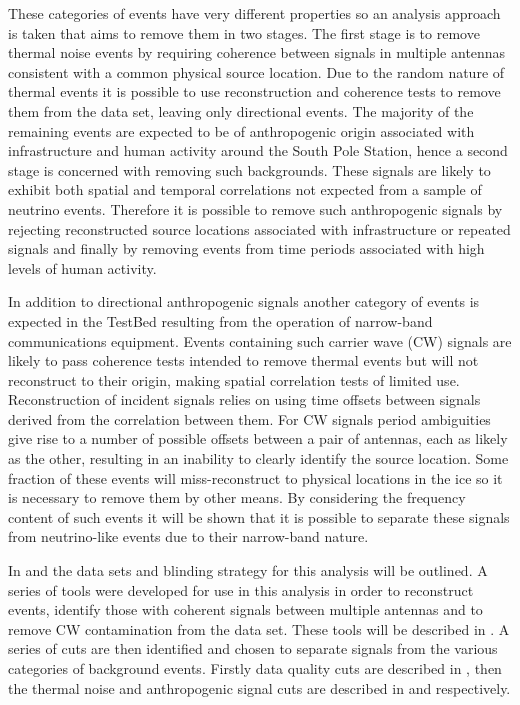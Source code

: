 These categories of events have very different properties so an analysis approach is taken that aims to remove them in two stages. The first stage is to remove thermal noise events by requiring coherence between signals in multiple antennas consistent with a common physical source location. Due to the random nature of thermal events it is possible to use reconstruction and coherence tests to remove them from the data set, leaving only directional events. The majority of the remaining events are expected to be of anthropogenic origin associated with infrastructure and human activity around the South Pole Station, hence a second stage is concerned with removing such backgrounds. These signals are likely to exhibit both spatial and temporal correlations not expected from a sample of neutrino events. Therefore it is possible to remove such anthropogenic signals by rejecting reconstructed source locations associated with infrastructure or repeated signals and finally by removing events from time periods associated with high levels of human activity.

In addition to directional anthropogenic signals another category of events is expected in the TestBed resulting from the operation of narrow-band communications equipment. Events containing such carrier wave (CW) signals are likely to pass coherence tests intended to remove thermal events but will not reconstruct to their origin, making spatial correlation tests of limited use. Reconstruction of incident signals relies on using time offsets between signals derived from the correlation between them. For CW signals period ambiguities give rise to a number of possible offsets between a pair of antennas, each as likely as the other, resulting in an inability to clearly identify the source location. Some fraction of these events will miss-reconstruct to physical locations in the ice so it is necessary to remove them by other means. By considering the frequency content of such events it will be shown that it is possible to separate these signals from neutrino-like events due to their narrow-band nature.



In  and  the data sets and blinding strategy for this analysis will be outlined. A series of tools were developed for use in this analysis in order to reconstruct events, identify those with coherent signals between multiple antennas and to remove CW contamination from the data set. These tools will be described in . A series of cuts are then identified and chosen to separate signals from the various categories of background events. Firstly data quality cuts are described in , then the thermal noise and anthropogenic signal cuts are described in  and  respectively.

